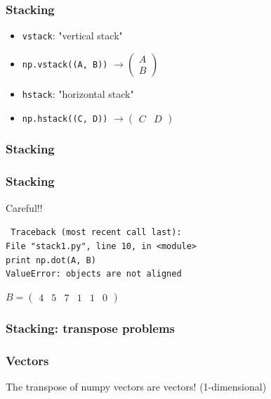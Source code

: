 \documentclass{beamer}
\begin{document}
\begin{frame}
\frametitle{Stacking}

\begin{itemize}
\item \texttt{vstack}: "vertical stack"
\item \texttt{np.vstack((A, B))} $\to \begin{pmatrix} A \\ B \end{pmatrix}$
\end{itemize}
\begin{itemize}
\item \texttt{hstack}: "horizontal stack"
\item \texttt{np.hstack((C, D))} $\to \begin{pmatrix} C & D \end{pmatrix}$
\end{itemize}

\end{frame}

\begin{frame}
\frametitle{Stacking}


\end{frame}

\begin{frame}
\frametitle{Stacking}

Careful!!

\texttt{
Traceback (most recent call last): \\
  File "stack1.py", line 10, in <module> \\
    print np.dot(A, B) \\
ValueError: objects are not aligned
}


$B = \begin{pmatrix} 4 & 5 & 7 & 1 & 1 & 0 \end{pmatrix}$

\end{frame}

\begin{frame}
\frametitle{Stacking: transpose problems}


\end{frame}

\begin{frame}
\frametitle{Vectors}

The transpose of numpy vectors are vectors! (1-dimensional)


\end{frame}
\end{document}
